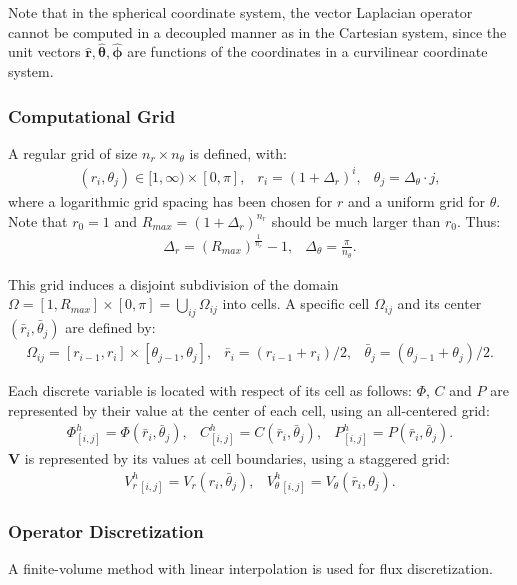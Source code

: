 \documentclass[10pt]{ijnam}
\newcommand{\pars}[1]{\left(#1\right)}
\newcommand\bV{\boldsymbol{V}}
\newcommand\br{\boldsymbol{r}}
\newcommand\brhat{\hat{\br}}
\newcommand\btheta{\boldsymbol{\theta}}
\newcommand\bthetahat{\hat{\btheta}}
\newcommand\bphi{\boldsymbol{\phi}}
\newcommand\bphihat{\hat{\bphi}}
\begin{document}
Note that in the spherical coordinate system,
the vector Laplacian operator cannot be computed in a decoupled manner as in the Cartesian system,
since the unit vectors $\brhat, \bthetahat, \bphihat$ are functions of the coordinates
in a curvilinear coordinate system.

\subsubsection{Computational Grid}
A regular grid of size $n_r \times n_\theta$ is defined, with:
\begin{eqnarray*}
(r_i,\theta_j) \in [1, \infty) \times [0,\pi], & 
r_i = (1+\Delta_r)^i, &
 \theta_j = \Delta_\theta \cdot j,
\end{eqnarray*}
where a logarithmic grid spacing has been chosen for $r$ and a uniform grid for $\theta$.
Note that $r_0 = 1$ and $R_{max} = (1+\Delta_r)^{n_r}$ should be much 
larger than $r_0$. Thus:
\begin{eqnarray*}
\Delta_r = \pars{R_{max}} ^ \frac{1}{n_r} - 1 ,& \Delta_\theta = \frac{\pi}{n_\theta}.
\end{eqnarray*}

This grid induces a disjoint subdivision of the domain 
$\Omega = [1, R_{max}] \times [0,\pi] = \bigcup_{ij}\Omega_{ij}$ into cells.
A specific cell $\Omega_{ij}$ and its center $(\bar{r}_i, \bar{\theta}_j)$ are defined by:
\begin{eqnarray*}
\Omega_{ij} = [r_{i-1}, r_{i}] \times [\theta_{j-1}, \theta_{j}], &
\bar{r}_i = (r_{i-1} + r_{i})/2, &
\bar{\theta}_j = (\theta_{j-1} + \theta_{j})/2.
\end{eqnarray*}

Each discrete variable is located with respect of its cell as follows:
$\varPhi$, $C$ and $P$ are represented by their value at the center of each cell, 
using an all-centered grid:
\begin{eqnarray*}
\varPhi^h_{[i,j]} = \varPhi(\bar{r}_i, \bar{\theta}_j), &
C^h_{[i,j]} = C(\bar{r}_i, \bar{\theta}_j), &
P^h_{[i,j]} = P(\bar{r}_i, \bar{\theta}_j).
\end{eqnarray*}
$\bV$ is represented by its values at cell boundaries, using a staggered grid:
\begin{eqnarray*}
V_r^h{}_{[i,j]} = V_r(r_i, \bar{\theta}_j), &
V_\theta^h{}_{[i,j]} = V_\theta(\bar{r}_i, {\theta}_j).
\end{eqnarray*}

\subsubsection{Operator Discretization}
A finite-volume method with linear interpolation is used for flux discretization. 
\end{document}
